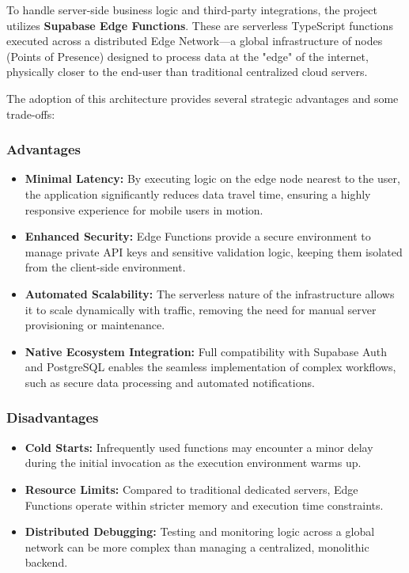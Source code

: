To handle server-side business logic and third-party integrations, the project utilizes \textbf{Supabase Edge Functions}. These are serverless TypeScript functions executed across a distributed Edge Network—a global infrastructure of nodes (Points of Presence) designed to process data at the "edge" of the internet, physically closer to the end-user than traditional centralized cloud servers.

The adoption of this architecture provides several strategic advantages and some trade-offs:

\subsubsection*{Advantages}
\begin{itemize}
    \item \textbf{Minimal Latency:} By executing logic on the edge node nearest to the user, the application significantly reduces data travel time, ensuring a highly responsive experience for mobile users in motion.
    \item \textbf{Enhanced Security:} Edge Functions provide a secure environment to manage private API keys and sensitive validation logic, keeping them isolated from the client-side environment.
    \item \textbf{Automated Scalability:} The serverless nature of the infrastructure allows it to scale dynamically with traffic, removing the need for manual server provisioning or maintenance.
    \item \textbf{Native Ecosystem Integration:} Full compatibility with Supabase Auth and PostgreSQL enables the seamless implementation of complex workflows, such as secure data processing and automated notifications.
\end{itemize}

\subsubsection*{Disadvantages}
\begin{itemize}
    \item \textbf{Cold Starts:} Infrequently used functions may encounter a minor delay during the initial invocation as the execution environment warms up.
    \item \textbf{Resource Limits:} Compared to traditional dedicated servers, Edge Functions operate within stricter memory and execution time constraints.
    \item \textbf{Distributed Debugging:} Testing and monitoring logic across a global network can be more complex than managing a centralized, monolithic backend.
\end{itemize}